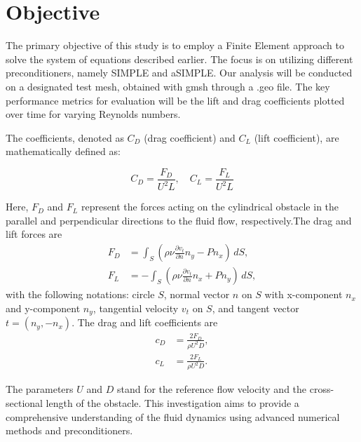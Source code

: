 \documentclass{article}
\begin{document}
\section{Objective}
The primary objective of this study is to employ a Finite Element approach to solve the system of equations described earlier. The focus is on utilizing different preconditioners, namely SIMPLE and aSIMPLE. Our analysis will be conducted on a designated test mesh, obtained with gmsh through a .geo file. The key performance metrics for evaluation will be the lift and drag coefficients plotted over time for varying Reynolds numbers.

The coefficients, denoted as \(C_D\) (drag coefficient) and \(C_L\) (lift coefficient), are mathematically defined as:

\begin{equation}
C_D = \frac{F_D}{U^2L}, \quad C_L = \frac{F_L}{U^2L} \label{eq:coefficients}
\end{equation}

Here, \(F_D\) and \(F_L\) represent the forces acting on the cylindrical obstacle in the parallel and perpendicular directions to the fluid flow, respectively.The drag and lift forces are
\begin{align*}
    F_D &= \int_S \left(\rho\nu \frac{\partial v_t}{\partial n}n_y - Pn_x\right) \, dS, \\
    F_L &= -\int_S \left(\rho\nu \frac{\partial v_t}{\partial n}n_x + Pn_y\right) \, dS,
\end{align*}
with the following notations: circle $S$, normal vector $n$ on $S$ with x-component $n_x$ and y-component $n_y$, tangential velocity $v_t$ on $S$, and tangent vector $t = (n_y, -n_x)$. The drag and lift coefficients are
\begin{align*}
    c_D &= \frac{2F_D}{\rho U^2D}, \\
    c_L &= \frac{2F_L}{\rho U^2D}.
\end{align*}

The parameters \(U\) and \(D\) stand for the reference flow velocity and the cross-sectional length of the obstacle. This investigation aims to provide a comprehensive understanding of the fluid dynamics using advanced numerical methods and preconditioners.
\end{document}
